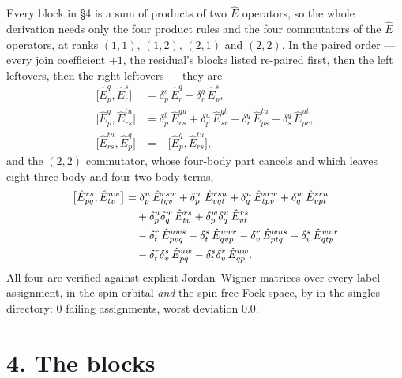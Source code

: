 \documentclass[11pt]{article}
\newcommand{\E}[2]{\hat E^{#1}_{#2}}
\begin{document}
Every block in \S4 is a sum of products of two $\hat E$ operators, so the whole
derivation needs only the four product rules and the four commutators of the
$\hat E$ operators, at ranks $(1,1)$, $(1,2)$, $(2,1)$ and $(2,2)$. In the
paired order --- every join coefficient $+1$, the residual's blocks listed
re-paired first, then the left leftovers, then the right leftovers --- they are
\begin{align}
  \bigl[\E{q}{p},\E{s}{r}\bigr]
   &=\delta^s_p\,\E{q}{r}-\delta^q_r\,\E{s}{p},
   \label{eq:c11}\\[2pt]
  \bigl[\E{q}{p},\E{tu}{rs}\bigr]
   &=\delta^t_p\,\E{qu}{rs}+\delta^u_p\,\E{qt}{sr}
     -\delta^q_r\,\E{tu}{ps}-\delta^q_s\,\E{ut}{pr},
   \label{eq:c12}\\[2pt]
  \bigl[\E{tu}{rs},\E{q}{p}\bigr]
   &=-\bigl[\E{q}{p},\E{tu}{rs}\bigr],
   \label{eq:c21}
\end{align}
and the $(2,2)$ commutator, whose four-body part cancels and which leaves eight
three-body and four two-body terms,
\begin{align}
  \bigl[\E{rs}{pq},\E{uw}{tv}\bigr]
   &=\delta^u_p\,\E{rsw}{tqv}+\delta^w_p\,\E{rsu}{vqt}
     +\delta^u_q\,\E{srw}{tpv}+\delta^w_q\,\E{sru}{vpt}\notag\\
   &\quad+\delta^u_p\delta^w_q\,\E{rs}{tv}
         +\delta^w_p\delta^u_q\,\E{rs}{vt}\notag\\
   &\quad-\delta^r_t\,\E{uws}{pvq}-\delta^s_t\,\E{uwr}{qvp}
         -\delta^r_v\,\E{wus}{ptq}-\delta^s_v\,\E{wur}{qtp}\notag\\
   &\quad-\delta^r_t\delta^s_v\,\E{uw}{pq}
         -\delta^s_t\delta^r_v\,\E{uw}{qp}.
   \label{eq:c22}
\end{align}
All four are verified against explicit Jordan--Wigner matrices over every label
assignment, in the spin-orbital \emph{and} the spin-free Fock space, by
 in the singles directory: 0 failing
assignments, worst deviation $0.0$.

\section*{4. The blocks}
\end{document}
